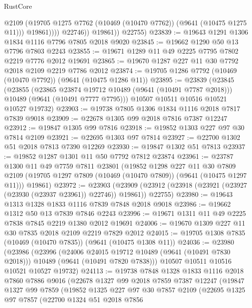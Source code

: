 \begin{lexlean}{RustCore}
\begin{coremodule}
                      @2109
                      (@19705 @1275 @7762 (@10469 (@10470 @7762)) (@9641 (@10475 @1275 @11)))
                      @19861))))
              @22746))
          @19861))
      @22755)
@23839 := @19643 @1291 @1306 @1834 @1116 @7796 @7805 @2018 @9020
@23845 := @19662 @1290 @50 @13 @7796 @7803 @2243
@23855 := @19671 @1289 @11 @49 @2225 @7795 @7802 @2219 @7776 @2012 @19691
@23865 := @19670 @1287 @227 @11 @30 @7792 @2018 @2109 @2219 @7786 @2012
@23874 := @19705 @1286 @7792 (@10469 (@10470 @7792)) (@9641 (@10475 @1286 @11))
@23895 := @23839
    (@23845
      (@23855
        (@23865 @23874 @19712 @10489 (@9641 (@10491 @7787 @2018)))
        @10489
        (@9641 (@10491 @7777 @7795)))
      @10507
      @10511
      @10516
      @10521
      @10527
      @19732)
@23903 := @19738 @7805 @1306 @1834 @1116 @2018 @7817 @7839 @9018
@23909 := @22678 @1305 @99 @2018 @7816 @7387 @12247
@23912 := @19847 @1305 @99 @7816
@23918 := @19852 @1303 @227 @97 @30 @7814 @2109
@23921 := @22695 @1303 @97 @7814
@23927 := @22700 @1302 @51 @2018 @7813 @7390 @12269
@23930 := @19847 @1302 @51 @7813
@23937 := @19852 @1287 @1301 @11 @50 @7792 @7812 @23874
@23961 := @23787
    @1300
    @11
    @49
    @7759
    @7811
    @23801
    (@19852
      @1298
      @227
      @11
      @30
      @7809
      @2109
      (@19705 @1297 @7809 (@10469 (@10470 @7809)) (@9641 (@10475 @1297 @11)))
      @19861)
@23972 := @23903
    (@23909 (@23912 (@23918 (@23921 (@23927 (@23930 (@23937 @23961)) @22746)) @19861)) @22755)
@23980 := @19643 @1313 @1328 @1833 @1116 @7839 @7848 @2018 @9018
@23986 := @19662 @1312 @50 @13 @7839 @7846 @2243
@23996 := @19671 @1311 @11 @49 @2225 @7838 @7845 @2219 @1380 @2012 @19691
@24006 := @19670 @1309 @227 @11 @30 @7835 @2018 @2109 @2219 @7829 @2012
@24015 := @19705 @1308 @7835 (@10469 (@10470 @7835)) (@9641 (@10475 @1308 @11))
@24036 := @23980
    (@23986
      (@23996
        (@24006 @24015 @19712 @10489 (@9641 (@10491 @7830 @2018)))
        @10489
        (@9641 (@10491 @7820 @7838)))
      @10507
      @10511
      @10516
      @10521
      @10527
      @19732)
@24113 := @19738
    @7848
    @1328
    @1833
    @1116
    @2018
    @7860
    @7886
    @9016
    (@22678
      @1327
      @99
      @2018
      @7859
      @7387
      @12247
      (@19847
        @1327
        @99
        @7859
        (@19852
          @1325
          @227
          @97
          @30
          @7857
          @2109
          (@22695
            @1325
            @97
            @7857
            (@22700
              @1324
              @51
              @2018
              @7856

\end{coremodule}
\end{lexlean}
